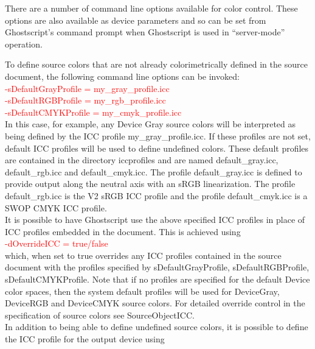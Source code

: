 \documentclass[12pt,notitlepage]{article}
\begin{document}
There are a number of command line options available for color control.  These options are also available as device parameters and so can be set from Ghostscript's command prompt when Ghostscript is used in ``server-mode'' operation.

To define source colors that are not already colorimetrically defined in the source document, the following command line options can be invoked:\\

\textcolor{red}{-sDefaultGrayProfile = my\_gray\_profile.icc}\\

\textcolor{red}{-sDefaultRGBProfile = my\_rgb\_profile.icc}\\

\textcolor{red}{-sDefaultCMYKProfile = my\_cmyk\_profile.icc}\\

 \noindent In this case, for example, any Device Gray source colors will be interpreted as being defined by the ICC profile my\_gray\_profile.icc.  If these profiles are not set, default ICC profiles will be used to define undefined colors.  These default profiles are contained in the directory iccprofiles and are named default\_gray.icc, default\_rgb.icc and default\_cmyk.icc.  The profile default\_gray.icc is defined to provide output along the neutral axis with an sRGB linearization.  The profile default\_rgb.icc is the V2 sRGB ICC profile and the profile default\_cmyk.icc is a SWOP CMYK ICC profile.\\

It is possible to have Ghostscript use the above specified ICC profiles in place of ICC profiles embedded in the document.  This is achieved using\\

 \textcolor{red}{-dOverrideICC = true/false}\\

\noindent which, when set to true overrides any ICC profiles contained in the source document with the profiles specified by sDefaultGrayProfile, sDefaultRGBProfile, sDefaultCMYKProfile. Note that if no profiles are specified for the default Device color spaces, then the system default profiles will be used for DeviceGray, DeviceRGB and DeviceCMYK source colors. For detailed override control in the specification of source colors see SourceObjectICC.\\

In addition to being able to define undefined source colors, it is possible to define the ICC profile for the output device using\\
\end{document}
